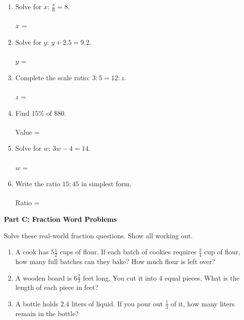 \documentclass[12pt, letterpaper, fleqn]{article}
\begin{document}
\begin{enumerate}[itemsep=1.5cm, leftmargin=0.6cm]
\item Solve for $x$: $\frac{x}{6} = 8$. \\ \\
$x$ = 

\item Solve for $y$: $y + 2.5 = 9.2$. \\ \\
$y$ = 

\item Complete the scale ratio: $3:5 = 12:z$. \\ \\
$z$ = 

\item Find $15\%$ of $\$80$. \\ \\
Value = 

\item Solve for $w$: $3w - 4 = 14$. \\ \\
$w$ = 

\item Write the ratio $15:45$ in simplest form. \\ \\
Ratio = 
\end{enumerate}

\newpage

\begin{tcolorbox}[colback=black!10]
    \large\textcolor{black}{\textbf{Part C: Fraction Word Problems}}
\end{tcolorbox}

\vspace{3mm}

\noindent
Solve these real-world fraction questions. Show all working out.

\vspace{5mm}

\begin{enumerate}[itemsep=3cm, leftmargin=0.6cm]
\item A cook has $5\frac{1}{2}$ cups of flour. If each batch of cookies requires $\frac{3}{4}$ cup of flour, how many full batches can they bake? How much flour is left over?
\vspace{2cm}

\item A wooden board is $6\frac{2}{3}$ feet long. You cut it into 4 equal pieces. What is the length of each piece in feet?
\vspace{2cm}

\item A bottle holds $2.4$ liters of liquid. If you pour out $\frac{1}{3}$ of it, how many liters remain in the bottle?
\end{enumerate}
\end{document}
